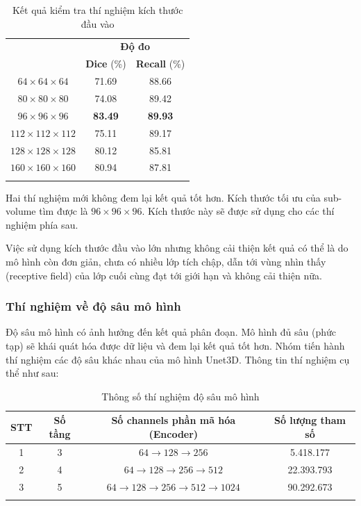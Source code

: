 \begin{table}[H]
\renewcommand{\arraystretch}{1.2}
\centering
\begin{tabular}{c|c|c}
\Xhline{3\arrayrulewidth}
\multirow{2}{*}{\textbf{Thí nghiệm}} & \multicolumn{2}{c}{\textbf{Độ đo}}        \\ \cline{2-3} 
                                     & \textbf{Dice} (\%) & \textbf{Recall} (\%) \\ \hline
$64 \times 64 \times 64$        & 71.69          & 88.66          \\ \hline
$80 \times 80 \times 80$        & 74.08          & 89.42          \\ \hline
$96 \times 96 \times 96$        & \textbf{83.49} & \textbf{89.93} \\ \hline
$112 \times 112 \times 112$        & 75.11          & 89.17          \\ \hline
$128 \times 128 \times 128$     & 80.12          & 85.81          \\ \hline
$160 \times 160 \times 160$     & 80.94          & 87.81          \\ 
\Xhline{3\arrayrulewidth}
\end{tabular}
\caption{Kết quả kiểm tra thí nghiệm kích thước đầu vào}
\end{table}
Hai thí nghiệm mới không đem lại kết quả tốt hơn. Kích thước tối ưu của sub-volume tìm được là $96 \times 96 \times 96$. Kích thước này sẽ được sử dụng cho các thí nghiệm phía sau.\par
Việc sử dụng kích thước đầu vào lớn nhưng không cải thiện kết quả có thể là do mô hình còn đơn giản, chưa có nhiều lớp tích chập, dẫn tới vùng nhìn thấy (receptive field) của lớp cuối cùng đạt tới giới hạn và không cải thiện nữa.\par

\subsubsection{Thí nghiệm về độ sâu mô hình}
Độ sâu mô hình có ảnh hưởng đến kết quả phân đoạn. Mô hình đủ sâu (phức tạp) sẽ khái quát hóa được dữ liệu và đem lại kết quả tốt hơn. Nhóm tiến hành thí nghiệm các độ sâu khác nhau của mô hình Unet3D. Thông tin thí nghiệm cụ thể như sau:
\begin{table}[H]
\renewcommand{\arraystretch}{1.2}
\centering
\begin{tabular}{c|c|c|c}
\Xhline{3\arrayrulewidth}
\textbf{STT} & \textbf{Số tầng} & \textbf{Số channels phần mã hóa (Encoder)} & \textbf{Số lượng tham số} \\ \hline
1     & 3       & $64 \to 128 \to 256$                   & 5.418.177   \\ \hline
2     & 4       & $64 \to 128 \to 256 \to 512$           & 22.393.793  \\ \hline
3     & 5       & $64 \to 128 \to 256 \to 512 \to 1024$  & 90.292.673  \\ 
\Xhline{3\arrayrulewidth}
\end{tabular}
\caption{Thông số thí nghiệm độ sâu mô hình}
\end{table}

